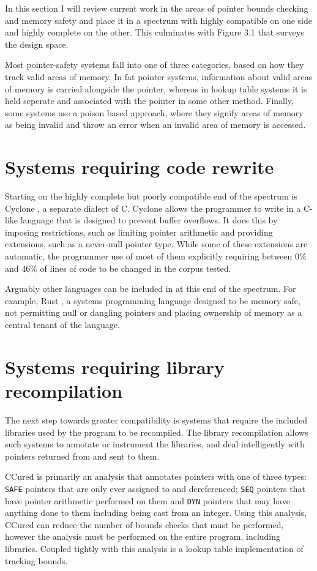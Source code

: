 

In this section I will review current work in the areas of pointer bounds checking and memory safety and place it in a spectrum with highly compatible on one side and highly complete on the other.
This culminates with Figure 3.1 that surveys the design space.

Most pointer-safety systems fall into one of three categories, based on how they track valid areas of memory.
In fat pointer systems, information about valid areas of memory is carried alongside the pointer, whereas in lookup table systems it is held seperate and associated with the pointer in some other method.
Finally, some systems use a poison based approach, where they signify areas of memory as being invalid and throw an error when an invalid area of memory is accessed.

\section{Systems requiring code rewrite}
Starting on the highly complete but poorly compatible end of the spectrum is Cyclone \cite{jim2002cyclone}, a separate dialect of C.
Cyclone allows the programmer to write in a C-like language that is designed to prevent buffer overflows.
It does this by imposing restrictions, such as limiting pointer arithmetic and providing extensions, such as a never-null pointer type.
While some of these extensions are automatic, the programmer use of most of them explicitly requiring between 0\% and 46\% of lines of code to be changed in the corpus tested.

Arguably other languages can be included in at this end of the spectrum. 
For example, Rust \cite{rust}, a systems programming language designed to be memory safe, not permitting null or dangling pointers and placing ownership of memory as a central tenant of the language.

\section{Systems requiring library recompilation}

The next step towards greater compatibility is systems that require the included libraries used by the program to be recompiled.
The library recompilation allows such systems to annotate or instrument the libraries, and deal intelligently with pointers returned from and sent to them.

CCured \cite{necula2002ccured} is primarily an analysis that annotates pointers with one of three types: \verb!SAFE! pointers that are only ever assigned to and dereferenced; \verb!SEQ! pointers that have pointer arithmetic performed on them and \verb!DYN! pointers that may have anything done to them including being cast from an integer.
Using this analysis, CCured can reduce the number of bounds checks that must be performed, however the analysis must be performed on the entire program, including libraries.
Coupled tightly with this analysis is a lookup table implementation of tracking bounds.

